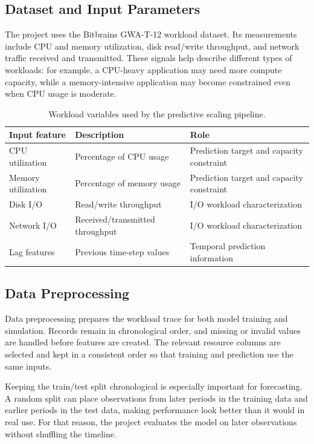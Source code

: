\documentclass[10pt,journal,compsoc]{IEEEtran}
\begin{document}
\subsection{Dataset and Input Parameters}
The project uses the Bitbrains GWA-T-12 workload dataset. Its measurements include CPU and memory utilization, disk read/write throughput, and network traffic received and transmitted. These signals help describe different types of workloads: for example, a CPU-heavy application may need more compute capacity, while a memory-intensive application may become constrained even when CPU usage is moderate.

\begin{table}[htbp]
\caption{Workload variables used by the predictive scaling pipeline.}
\centering
\begin{tabular}{|p{2.2cm}|p{2.6cm}|p{2.8cm}|}
\hline
\textbf{Input feature} & \textbf{Description} & \textbf{Role} \\ \hline
CPU utilization & Percentage of CPU usage & Prediction target and capacity constraint \\ \hline
Memory utilization & Percentage of memory usage & Prediction target and capacity constraint \\ \hline
Disk I/O & Read/write throughput & I/O workload characterization \\ \hline
Network I/O & Received/transmitted throughput & I/O workload characterization \\ \hline
Lag features & Previous time-step values & Temporal prediction information \\ \hline
\end{tabular}
\label{tab:variables}
\end{table}

\subsection{Data Preprocessing}
Data preprocessing prepares the workload trace for both model training and simulation. Records remain in chronological order, and missing or invalid values are handled before features are created. The relevant resource columns are selected and kept in a consistent order so that training and prediction use the same inputs.

Keeping the train/test split chronological is especially important for forecasting. A random split can place observations from later periods in the training data and earlier periods in the test data, making performance look better than it would in real use. For that reason, the project evaluates the model on later observations without shuffling the timeline.
\end{document}
